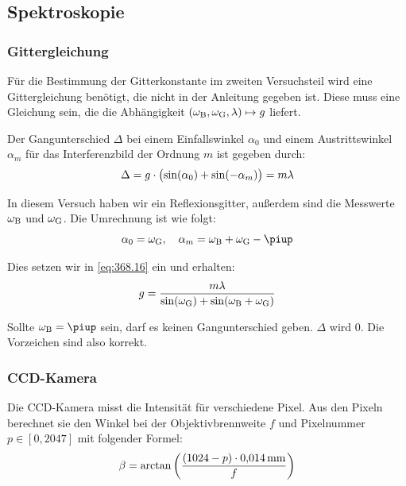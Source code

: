 \subsection{Spektroskopie}

\subsubsection{Gittergleichung}

Für die Bestimmung der Gitterkonstante im zweiten Versuchsteil wird eine
Gittergleichung benötigt, die nicht in der Anleitung gegeben ist. Diese muss
eine Gleichung sein, die die Abhängigkeit $(\omega_\text B, \omega_\text G,
\lambda) \mapsto g$ liefert.

Der Gangunterschied $\Delta$ bei einem Einfallswinkel $\alpha_0$ und einem
Austrittswinkel $\alpha_m$ für das Interferenzbild der Ordnung $m$ ist gegeben
durch: \cite[Formel~368.16]{physik312-Anleitung}
\begin{equation}
    \label{eq:368.16}
    \Delta = g \cdot \del{\sin(\alpha_0) + \sin(-\alpha_m)} = m \lambda
\end{equation}

In diesem Versuch haben wir ein Reflexionsgitter, außerdem sind die Messwerte
$\omega_\text B$ und $\omega_\text G$. Die Umrechnung ist wie folgt:
\[
    \alpha_0 = \omega_\text G
    \eqnsep
    \alpha_m = \omega_\text B + \omega_\text G - \piup
\]

Dies setzen wir in \eqref{eq:368.16} ein und erhalten:
\begin{equation}
    \label{eq:gittergleichung}
    g = \frac{m \lambda}{\sin(\omega_\text G) + \sin(\omega_\text B + \omega_\text G)}
\end{equation}

Sollte $\omega_\text B = \piup$ sein, darf es keinen Gangunterschied geben.
$\Delta$ wird 0. Die Vorzeichen sind also korrekt.

\subsubsection{CCD-Kamera}

Die CCD-Kamera misst die Intensität für verschiedene Pixel. Aus den Pixeln
berechnet sie den Winkel bei der Objektivbrennweite $f$ und Pixelnummer $p \in
[0, 2047]$ mit folgender Formel:
\[
    \beta = \arctan\del{\frac{(1024 - p) \cdot \SI{0.014}{\milli\meter}}f}
\]


